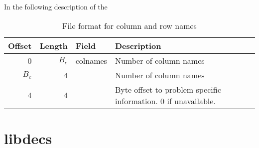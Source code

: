 In the following description of the 


\begin{table}[htbp]
	\centering
	\begin{tabular}{|r|r|l|p{2.6in}|}
		\hline
		\bf Offset & \bf Length & \bf Field & \bf Description \\ \hline
		0     & $B_c$ & colnames & Number of column names \\ \hline
		$B_c$ & 4     &  & Number of column names \\ \hline
		4     & 4     &   & Byte offset to problem specific information. 0 if unavailable. \\ \hline
	\end{tabular}
	\caption{File format for column and row names}
	\label{tab:colrowformat}
\end{table}





\section{libdecs}





